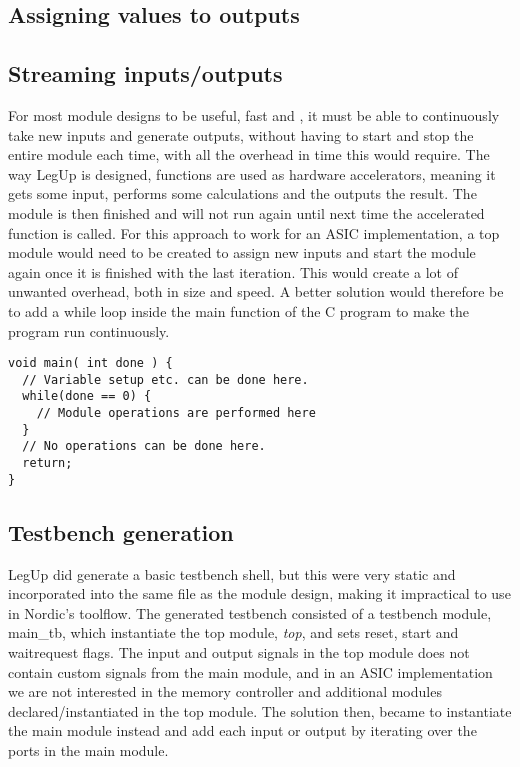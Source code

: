 \subsection{\label{sec:assValueToOutput}Assigning values to outputs}

\subsection{Streaming inputs/outputs}
For most module designs to be useful, fast and , it must be able to continuously take new inputs and generate outputs, without having to start and stop the entire module each time, with all the overhead in time this would require. The way LegUp is designed, functions are used as hardware accelerators, meaning it gets some input, performs some calculations and the outputs the result. The module is then finished and will not run again until next time the accelerated function is called. For this approach to work for an ASIC implementation, a top module would need to be created to assign new inputs and start the module again once it is finished with the last iteration. This would create a lot of unwanted overhead, both in size and speed. A better solution would therefore be to add a while loop inside the main function of the C program to make the program run continuously.

\lstset{language=C,style=Cstyle}
\begin{lstlisting}[caption={FIR-filter implemented in C},label=lst:firfilterc]
void main( int done ) {
  // Variable setup etc. can be done here.
  while(done == 0) {
    // Module operations are performed here
  }
  // No operations can be done here.
  return;
}
\end{lstlisting}

\subsection{Testbench generation}
LegUp did generate a basic testbench shell, but this were very static and incorporated into the same file as the module design, making it impractical to use in Nordic's toolflow. The generated testbench consisted of a testbench module, main\_tb, which instantiate the top module, \textit{top}, and sets reset, start and waitrequest flags. The input and output signals in the top module does not contain custom signals from the main module, and in an ASIC implementation we are not interested in the memory controller and additional modules declared/instantiated in the top module. The solution then, became to instantiate the main module instead and add each input or output by iterating over the ports in the main module.

